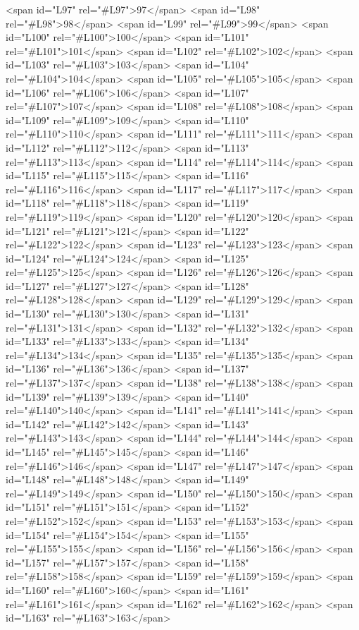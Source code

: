 <span id="L97" rel="#L97">97</span>
<span id="L98" rel="#L98">98</span>
<span id="L99" rel="#L99">99</span>
<span id="L100" rel="#L100">100</span>
<span id="L101" rel="#L101">101</span>
<span id="L102" rel="#L102">102</span>
<span id="L103" rel="#L103">103</span>
<span id="L104" rel="#L104">104</span>
<span id="L105" rel="#L105">105</span>
<span id="L106" rel="#L106">106</span>
<span id="L107" rel="#L107">107</span>
<span id="L108" rel="#L108">108</span>
<span id="L109" rel="#L109">109</span>
<span id="L110" rel="#L110">110</span>
<span id="L111" rel="#L111">111</span>
<span id="L112" rel="#L112">112</span>
<span id="L113" rel="#L113">113</span>
<span id="L114" rel="#L114">114</span>
<span id="L115" rel="#L115">115</span>
<span id="L116" rel="#L116">116</span>
<span id="L117" rel="#L117">117</span>
<span id="L118" rel="#L118">118</span>
<span id="L119" rel="#L119">119</span>
<span id="L120" rel="#L120">120</span>
<span id="L121" rel="#L121">121</span>
<span id="L122" rel="#L122">122</span>
<span id="L123" rel="#L123">123</span>
<span id="L124" rel="#L124">124</span>
<span id="L125" rel="#L125">125</span>
<span id="L126" rel="#L126">126</span>
<span id="L127" rel="#L127">127</span>
<span id="L128" rel="#L128">128</span>
<span id="L129" rel="#L129">129</span>
<span id="L130" rel="#L130">130</span>
<span id="L131" rel="#L131">131</span>
<span id="L132" rel="#L132">132</span>
<span id="L133" rel="#L133">133</span>
<span id="L134" rel="#L134">134</span>
<span id="L135" rel="#L135">135</span>
<span id="L136" rel="#L136">136</span>
<span id="L137" rel="#L137">137</span>
<span id="L138" rel="#L138">138</span>
<span id="L139" rel="#L139">139</span>
<span id="L140" rel="#L140">140</span>
<span id="L141" rel="#L141">141</span>
<span id="L142" rel="#L142">142</span>
<span id="L143" rel="#L143">143</span>
<span id="L144" rel="#L144">144</span>
<span id="L145" rel="#L145">145</span>
<span id="L146" rel="#L146">146</span>
<span id="L147" rel="#L147">147</span>
<span id="L148" rel="#L148">148</span>
<span id="L149" rel="#L149">149</span>
<span id="L150" rel="#L150">150</span>
<span id="L151" rel="#L151">151</span>
<span id="L152" rel="#L152">152</span>
<span id="L153" rel="#L153">153</span>
<span id="L154" rel="#L154">154</span>
<span id="L155" rel="#L155">155</span>
<span id="L156" rel="#L156">156</span>
<span id="L157" rel="#L157">157</span>
<span id="L158" rel="#L158">158</span>
<span id="L159" rel="#L159">159</span>
<span id="L160" rel="#L160">160</span>
<span id="L161" rel="#L161">161</span>
<span id="L162" rel="#L162">162</span>
<span id="L163" rel="#L163">163</span>
